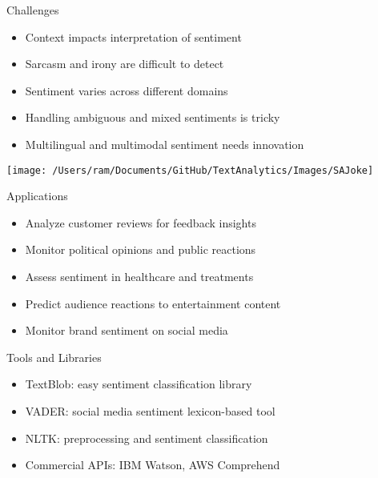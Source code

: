 \begin{frame}{Challenges}
    \begin{multicols}{2}
    \begin{itemize}
        \item Context impacts interpretation of sentiment
        \item Sarcasm and irony are difficult to detect
        \item Sentiment varies across different domains
        \item Handling ambiguous and mixed sentiments is tricky
        \item Multilingual and multimodal sentiment needs innovation
    \end{itemize}
    \vfill\null
    \columnbreak
    \begin{center}
    \texttt{[image: /Users/ram/Documents/GitHub/TextAnalytics/Images/SAJoke]}
    \end{center}

    \end{multicols}
\end{frame}

\begin{frame}{Applications}
    \begin{itemize}
        \item Analyze customer reviews for feedback insights
        \item Monitor political opinions and public reactions
        \item Assess sentiment in healthcare and treatments
        \item Predict audience reactions to entertainment content
        \item Monitor brand sentiment on social media
    \end{itemize}
\end{frame}

\begin{frame}{Tools and Libraries}
    \begin{itemize}
        \item TextBlob: easy sentiment classification library
        \item VADER: social media sentiment lexicon-based tool
        \item NLTK: preprocessing and sentiment classification
        \item Commercial APIs: IBM Watson, AWS Comprehend
    \end{itemize}
\end{frame}

